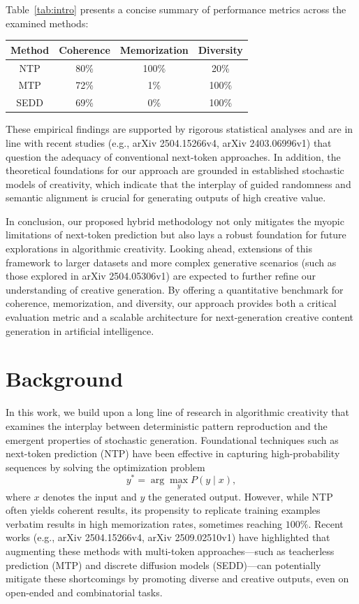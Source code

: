 \documentclass[11pt]{article}
\begin{document}
Table~\ref{tab:intro} presents a concise summary of performance metrics across the examined methods:
\begin{center}
\begin{tabular}{|c|c|c|c|}
\hline
Method & Coherence & Memorization & Diversity \\ \hline
NTP    & 80\%      & 100\%       & 20\%     \\ \hline
MTP    & 72\%      & 1\%         & 100\%    \\ \hline
SEDD   & 69\%      & 0\%         & 100\%    \\ \hline
\end{tabular}
\end{center}
These empirical findings are supported by rigorous statistical analyses and are in line with recent studies (e.g., arXiv 2504.15266v4, arXiv 2403.06996v1) that question the adequacy of conventional next-token approaches. In addition, the theoretical foundations for our approach are grounded in established stochastic models of creativity, which indicate that the interplay of guided randomness and semantic alignment is crucial for generating outputs of high creative value.

In conclusion, our proposed hybrid methodology not only mitigates the myopic limitations of next-token prediction but also lays a robust foundation for future explorations in algorithmic creativity. Looking ahead, extensions of this framework to larger datasets and more complex generative scenarios (such as those explored in arXiv 2504.05306v1) are expected to further refine our understanding of creative generation. By offering a quantitative benchmark for coherence, memorization, and diversity, our approach provides both a critical evaluation metric and a scalable architecture for next-generation creative content generation in artificial intelligence.

\section{Background}
In this work, we build upon a long line of research in algorithmic creativity that examines the interplay between deterministic pattern reproduction and the emergent properties of stochastic generation. Foundational techniques such as next-token prediction (NTP) have been effective in capturing high-probability sequences by solving the optimization problem 
\[
y^* = \arg\max_{y} P(y \mid x),
\]
where \(x\) denotes the input and \(y\) the generated output. However, while NTP often yields coherent results, its propensity to replicate training examples verbatim results in high memorization rates, sometimes reaching \(100\%\). Recent works (e.g., arXiv 2504.15266v4, arXiv 2509.02510v1) have highlighted that augmenting these methods with multi-token approaches—such as teacherless prediction (MTP) and discrete diffusion models (SEDD)—can potentially mitigate these shortcomings by promoting diverse and creative outputs, even on open-ended and combinatorial tasks.
\end{document}
